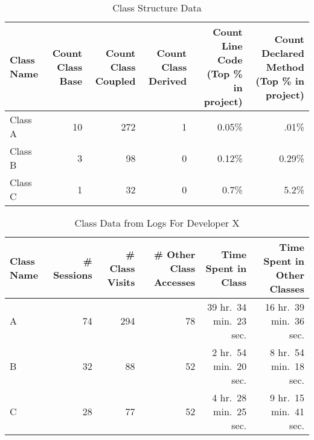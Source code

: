 \begin{table*}[!t]
    \renewcommand{\arraystretch}{1.3}
	\centering
	\caption{Class Structure Data}
	\begin{tabular}{lrrrrr}
	\toprule
\textbf{Class Name} & \textbf{Count Class Base} & \textbf{Count Class Coupled} & \textbf{Count Class Derived} & \textbf{Count Line Code} {(Top \% in project)} & \textbf{Count Declared Method} {(Top \% in project)}\\
\midrule
Class A & 10 & 272 & 1 & 0.05\% & .01\%\\
Class B & 3 & 98 & 0 & 0.12\% & 0.29\%\\
Class C & 1 & 32 & 0 & 0.7\% & 5.2\%\\
\bottomrule
	\end{tabular}
	\label{fig:ClassStructureAnalysisData}
\end{table*}

\begin{table*}[!t]
    \renewcommand{\arraystretch}{1.3}
	\centering
	\caption{Class Data from Logs For Developer X}
	\begin{tabular}{lrrrrr}
	\toprule
\textbf{Class Name} & \textbf{\# Sessions} & \textbf{\# Class Visits} & \textbf{\# Other Class Accesses} & \textbf{Time Spent in Class} & \textbf{Time Spent in Other Classes}\\
\midrule
A & 74 & 294 & 78 & 39 hr.\ 34 min.\ 23 sec. & 16 hr.\ 39 min.\ 36 sec.\\
B & 32 & 88 & 52 & 2 hr.\ 54 min.\ 20 sec. & 8 hr.\ 54 min.\ 18 sec.\\
C & 28 & 77 & 52 & 4 hr.\ 28 min.\ 25 sec. & 9 hr.\ 15 min.\ 41 sec.\\
\bottomrule
	\end{tabular}
	\label{fig:ClassAnalysisData}
\end{table*}


